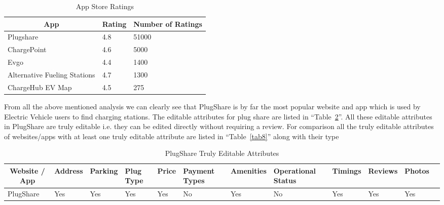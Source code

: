 \documentclass[conference]{IEEEtran}
\begin{document}
\begin{table}[htbp]
\caption{App Store Ratings}
\begin{center}
\begin{tabular}{|l|l|l|}
\hline
\multicolumn{1}{|c|}{\textbf{App}} & \multicolumn{1}{c|}{\textbf{Rating}} & \multicolumn{1}{c|}{\textbf{Number of Ratings}} \\ \hline
Plugshare & 4.8 & 51000 \\
ChargePoint & 4.6 & 5000 \\
Evgo & 4.4 & 1400 \\
Alternative Fueling Stations & 4.7 & 1300 \\
ChargeHub EV Map & 4.5 & 275 \\ \hline
\end{tabular}
\label{tab6}
\end{center}
\end{table}

\vspace{12pt}
From all the above mentioned analysis we can clearly see that PlugShare is by far the most popular website and app which is used by Electric Vehicle users to find charging stations. The editable attributes for plug share are listed in ``Table~\ref{tab7}''. All these editable attributes in PlugShare are truly editable i.e. they can be edited directly without requiring a review. For comparison all the truly editable attributes of websites/apps with at least one truly editable attribute are listed in ``Table~\ref{tab8}'' along with their type\\

\begin{table}[htbp]
\caption{PlugShare Truly Editable Attributes}
\begin{center}
\begin{tabular}{|l|l|l|l|l|l|l|l|l|l|l|l|}
\hline
\multicolumn{1}{|c|}{\textbf{Website / App}} & \multicolumn{1}{c|}{\textbf{Address}} & \multicolumn{1}{c|}{\textbf{Parking}} & \multicolumn{1}{p{0.1\columnwidth}|}{\textbf{Plug Type}} & \multicolumn{1}{c|}{\textbf{Price}} & \multicolumn{1}{p{0.12\columnwidth}|}{\textbf{Payment Types}} & \multicolumn{1}{c|}{\textbf{Amenities}} & \multicolumn{1}{p{0.16\columnwidth}|}{\textbf{Operational Status}} & \multicolumn{1}{c|}{\textbf{Timings}} & \multicolumn{1}{c|}{\textbf{Reviews}} & \multicolumn{1}{c|}{\textbf{Photos}} \\ \hline
PlugShare & Yes & Yes & Yes & Yes & No & Yes & No & Yes & Yes & Yes \\ \hline
\end{tabular}
\label{tab7}
\end{center}
\end{table}
\end{document}
